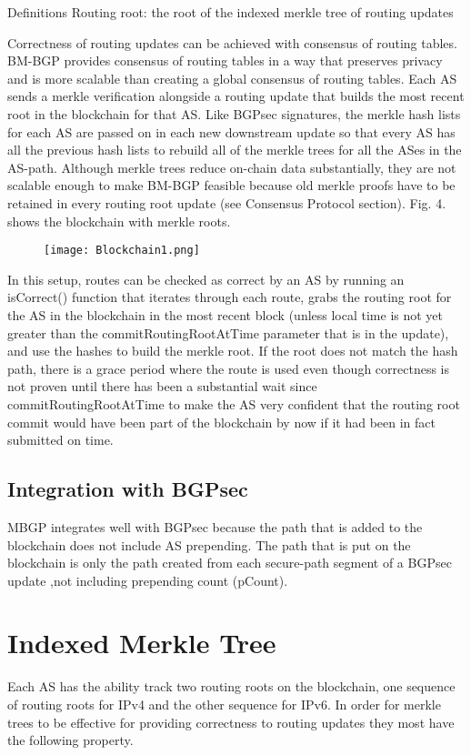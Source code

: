 \documentclass[letterpaper, 10 pt, conference]{ieeeconf}  %
\begin{document}
Definitions 
Routing root: the root of the indexed merkle tree of routing updates

Correctness of routing updates can be achieved with consensus of routing tables. BM-BGP provides consensus of routing tables in a way that preserves privacy and is more scalable than creating a global consensus of routing tables. Each AS sends a merkle verification alongside a routing update that builds the most recent root in the blockchain for that AS. Like BGPsec signatures, the merkle hash lists for each AS are passed on in each new downstream update so that every AS has all the previous hash lists to rebuild all of the merkle trees for all the ASes in the AS-path. Although merkle trees reduce on-chain data substantially, they are not scalable enough to make BM-BGP feasible because old merkle proofs have to be retained in every routing root update (see Consensus Protocol section). Fig. 4. shows the blockchain with merkle roots. 

\begin{figure}[!ht]
	\centering
	\texttt{[image: Blockchain1.png]}
    \end{figure}
 
In this setup, routes can be checked as correct by an AS by running an isCorrect() function that iterates through each route, grabs the routing root for the AS in the blockchain in the most recent block (unless local time is not yet greater than the commitRoutingRootAtTime parameter that is in the update), and use the hashes to build the merkle root. If the root does not match the hash path, there is a grace period where the route is used even though correctness is not proven until there has been a substantial wait since commitRoutingRootAtTime to make the AS very confident that the routing root commit would have been part of the blockchain by now if it had been in fact submitted on time. 

\subsection{Integration with BGPsec}
MBGP integrates well with BGPsec because the path that is added to the blockchain does not include AS prepending. The path that is put on the blockchain is only the path created from each secure-path segment of a BGPsec update ,not including prepending count (pCount). 


\section{Indexed Merkle Tree}
Each AS has the ability track two routing roots on the blockchain, one sequence of routing roots for IPv4 and the other sequence for IPv6. In order for merkle trees to be effective for providing correctness to routing updates they most have the following property. 
\end{document}

